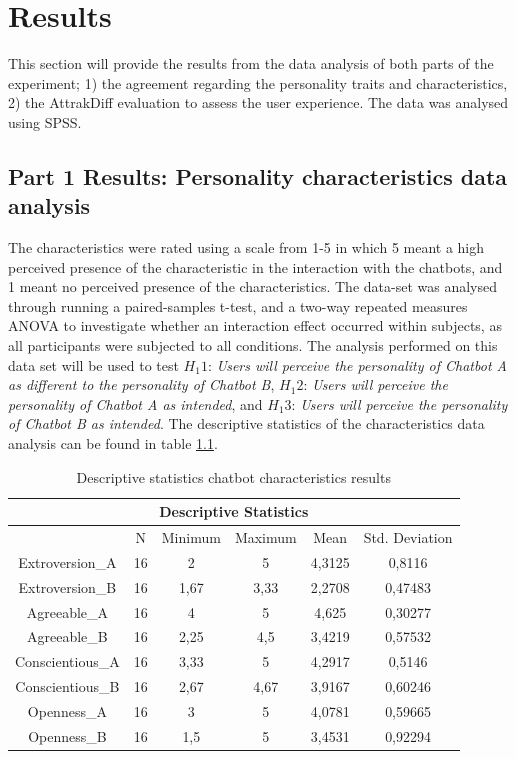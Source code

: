 \chapter{Results}
\label{chap:results}

This section will provide the results from the data analysis of both parts of the experiment; 1) the agreement regarding the personality traits and characteristics, 2) the AttrakDiff evaluation to assess the user experience. The data was analysed using SPSS.

\section{Part 1 Results: Personality characteristics data analysis}

The characteristics were rated using a scale from 1-5 in which 5 meant a high perceived presence of the characteristic in the interaction with the chatbots, and 1 meant no perceived presence of the characteristics. The data-set was analysed through running a paired-samples t-test, and a two-way repeated measures ANOVA to investigate whether an interaction effect occurred within subjects, as all participants were subjected to all conditions. The analysis performed on this data set will be used to test $H_1 1$: \textit{Users will perceive the personality of Chatbot A as different to the personality of Chatbot B}, $H_1 2$: \textit{Users will perceive the personality of Chatbot A as intended}, and $H_1 3$: \textit{Users will perceive the personality of Chatbot B as intended}. The descriptive statistics of the characteristics data analysis can be found in table \ref{table:5}.

\begin{table}[h]
\centering
\begin{tabular}{cccccc}
\hline
\multicolumn{6}{c}{\textbf{Descriptive Statistics}} \\
\hline
& N & Minimum & Maximum & Mean & Std. Deviation \\
Extroversion_A & 16 & 2 & 5 & 4,3125 & 0,8116 \\
Extroversion_B & 16 & 1,67 & 3,33 & 2,2708 & 0,47483 \\
Agreeable_A & 16 & 4 & 5 & 4,625 & 0,30277 \\
Agreeable_B & 16 & 2,25 & 4,5 & 3,4219 & 0,57532 \\
Conscientious_A & 16 & 3,33 & 5 & 4,2917 & 0,5146 \\
Conscientious_B & 16 & 2,67 & 4,67 & 3,9167 & 0,60246 \\
Openness_A & 16 & 3 & 5 & 4,0781 & 0,59665 \\
Openness_B & 16 & 1,5 & 5 & 3,4531 & 0,92294 \\
\end{tabular}
 \caption{Descriptive statistics chatbot characteristics results}
 \label{table:5}
    \end{table}

